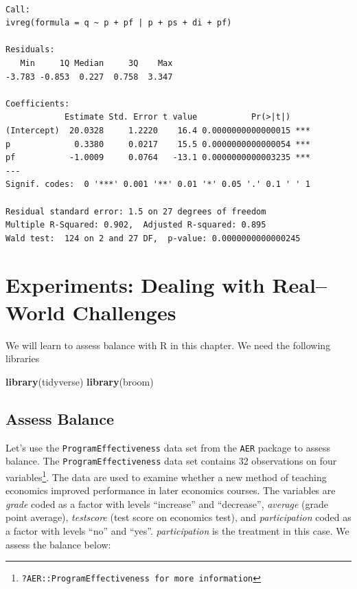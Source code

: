 \documentclass[]{book}
\newenvironment{Shaded}{\begin{snugshade}}{\end{snugshade}}
\newcommand{\KeywordTok}[1]{\textcolor[rgb]{0.13,0.29,0.53}{\textbf{#1}}}
\newcommand{\NormalTok}[1]{#1}
\let\rmarkdownfootnote\footnote%
\def\footnote{\protect\rmarkdownfootnote}
\begin{document}
\begin{verbatim}

Call:
ivreg(formula = q ~ p + pf | p + ps + di + pf)

Residuals:
   Min     1Q Median     3Q    Max 
-3.783 -0.853  0.227  0.758  3.347 

Coefficients:
            Estimate Std. Error t value           Pr(>|t|)    
(Intercept)  20.0328     1.2220    16.4 0.0000000000000015 ***
p             0.3380     0.0217    15.5 0.0000000000000054 ***
pf           -1.0009     0.0764   -13.1 0.0000000000003235 ***
---
Signif. codes:  0 '***' 0.001 '**' 0.01 '*' 0.05 '.' 0.1 ' ' 1

Residual standard error: 1.5 on 27 degrees of freedom
Multiple R-Squared: 0.902,  Adjusted R-squared: 0.895 
Wald test:  124 on 2 and 27 DF,  p-value: 0.0000000000000245 
\end{verbatim}

\hypertarget{chp10}{%
\chapter{Experiments: Dealing with Real--World Challenges}\label{chp10}}

We will learn to assess balance with R in this chapter. We need the following libraries

\begin{Shaded}
\begin{Highlighting}[]
\KeywordTok{library}\NormalTok{(tidyverse)}
\KeywordTok{library}\NormalTok{(broom)}
\end{Highlighting}
\end{Shaded}

\hypertarget{assess-balance}{%
\section{Assess Balance}\label{assess-balance}}

Let's use the \texttt{ProgramEffectiveness} data set from the \texttt{AER} package to assess balance. The \texttt{ProgramEffectiveness} data set contains 32 observations on four variables\footnote{\texttt{?AER::ProgramEffectiveness\ for\ more\ information}}. The data are used to examine whether a new method of teaching economics improved performance in later economics courses. The variables are \emph{grade} coded as a factor with levels ``increase'' and ``decrease'', \emph{average} (grade point average), \emph{testscore} (test score on economics test), and \emph{participation} coded as a factor with levels ``no'' and ``yes''. \emph{participation} is the treatment in this case. We assess the balance below:
\end{document}
